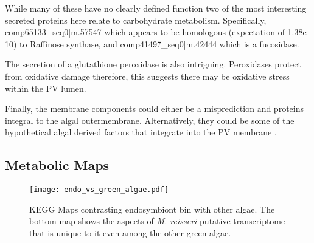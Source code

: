 While many of these have no clearly defined function two of the most interesting
secreted proteins here relate to carbohydrate metabolism.
Specifically, comp65133\_seq0|m.57547 which appears to be homologous 
(expectation of 1.38e-10) to Raffinose synthase, and comp41497\_seq0|m.42444
which is a fucosidase. 

The secretion of a glutathione peroxidase is also intriguing.  Peroxidases
protect from oxidative damage therefore, this suggests there may be oxidative
stress within the PV lumen. 

Finally, the  membrane components could either be a misprediction and 
proteins integral to the algal outermembrane. Alternatively, they could 
be some of the hypothetical algal derived factors that integrate into the
PV membrane \citep{Kodama2009a}.



\subsection{Metabolic Maps}


%
%
%


\begin{figure}
    \texttt{[image: endo\_vs\_green\_algae.pdf]}
    \caption[KEGG Maps of Endosymbiont Bin Compared with Other Algae]{
    KEGG Maps contrasting endosymbiont bin with other algae. The bottom map shows
the aspects of \textit{M. reisseri} putative transcriptome that is unique to it
even among the other green algae.}
\label{fig:algae_comp}
\end{figure}


